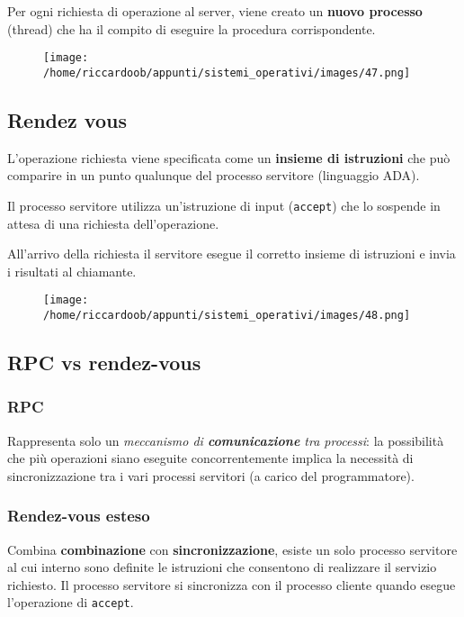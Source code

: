 Per ogni richiesta di operazione al server, viene creato un \textbf{nuovo processo} (thread) che ha il compito di eseguire la procedura corrispondente.

\begin{figure}[H]
    \centering
    \texttt{[image: /home/riccardoob/appunti/sistemi\_operativi/images/47.png]}
\end{figure}

\subsection{Rendez vous}

L'operazione richiesta viene specificata come un \textbf{insieme di istruzioni} che può comparire in un punto qualunque del processo servitore (linguaggio ADA).

Il processo servitore utilizza un'istruzione di input (\texttt{accept}) che lo sospende in attesa di una richiesta dell'operazione.

All'arrivo della richiesta il servitore esegue il corretto insieme di istruzioni e invia i risultati al chiamante.

\begin{figure}[H]
    \centering
    \texttt{[image: /home/riccardoob/appunti/sistemi\_operativi/images/48.png]}
\end{figure}

\subsection{RPC vs rendez-vous}

\subsubsection{RPC}
Rappresenta solo un \textit{meccanismo di \textbf{comunicazione} tra processi}: la possibilità che più operazioni siano eseguite concorrentemente implica la necessità di sincronizzazione tra i vari processi servitori (a carico del programmatore).

\subsubsection{Rendez-vous esteso}
Combina \textbf{combinazione} con \textbf{sincronizzazione}, esiste un solo processo servitore al cui interno sono definite le istruzioni che consentono di realizzare il servizio richiesto. Il processo servitore si sincronizza con il processo cliente quando esegue l'operazione di \texttt{accept}.

